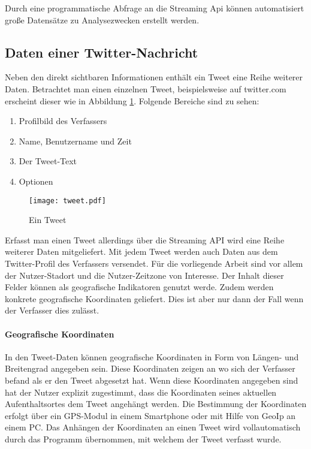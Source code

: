 			Durch eine programmatische Abfrage an die Streaming Api können automatisiert große Datensätze zu Analysezwecken erstellt werden. 


		\subsection{Daten einer Twitter-Nachricht}
			
			Neben den direkt sichtbaren Informationen enthält ein Tweet eine Reihe weiterer Daten.
			Betrachtet man einen einzelnen Tweet, beispielsweise auf twitter.com erscheint dieser wie in Abbildung \ref{img:tweet}.
			Folgende Bereiche sind zu sehen:

			\begin{enumerate}
				\item Profilbild des Verfassers
				\item Name, Benutzername und Zeit
				\item Der Tweet-Text
				\item Optionen
			\end{enumerate}


			\begin{figure}[h!]
			\begin{center}
			\texttt{[image: tweet.pdf]}
			\caption{Ein Tweet}
			\label{img:tweet}
			\end{center}
			\end{figure}	


			Erfasst man einen Tweet allerdings über die Streaming API wird eine Reihe weiterer Daten mitgeliefert.
			Mit jedem Tweet werden auch Daten aus dem Twitter-Profil des Verfassers versendet.
			Für die vorliegende Arbeit sind vor allem der Nutzer-Stadort und die Nutzer-Zeitzone von Interesse. 
			Der Inhalt dieser Felder können als geografische Indikatoren genutzt werde.
			Zudem werden konkrete geografische Koordinaten geliefert.
			Dies ist aber nur dann der Fall wenn der Verfasser dies zulässt. 

			\paragraph{Geografische Koordinaten}
				
				In den Tweet-Daten können geografische Koordinaten in Form von Längen- und Breitengrad angegeben sein. 
				Diese Koordinaten zeigen an wo sich der Verfasser befand als er den Tweet abgesetzt hat.
				Wenn diese Koordinaten angegeben sind hat der Nutzer explizit zugestimmt, dass die Koordinaten seines aktuellen Aufenthaltsortes dem Tweet angehängt werden. 
				Die Bestimmung der Koordinaten erfolgt über ein GPS-Modul in einem Smartphone oder mit Hilfe von GeoIp an einem PC.
				Das Anhängen der Koordinaten an einen Tweet wird vollautomatisch durch das Programm übernommen, mit welchem der Tweet verfasst wurde.

